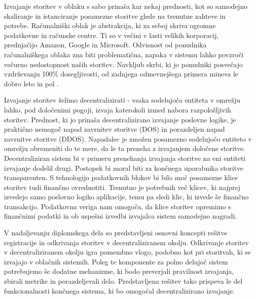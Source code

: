 \documentclass[a4paper, 12pt]{book}
\begin{document}
Izvajanje storitev v oblaku s sabo prinaša kar nekaj prednosti, kot so samodejno skaliranje in istanciranje posamezne storitve glede na trenutne zahteve in potrebe.
Računalniški oblak je abstrakcija, ki za seboj skriva ogromne podatkovne in računske centre.
Ti so v večini v lasti velikih korporacij, prednjačijo Amazon, Google in Microsoft.
Odvisnost od ponudnika računalniškega oblaka zna biti problematična, napaka v sistemu lahko povzroči večurno nedostopnost naših storitev. 
Navkljub skrbi, ki jo ponudniki posvečajo vzdrževanju 100\% dosegljivosti, od zadnjega odmevnejšega primera mineva le dobro leto in pol \cite{awsFail}.

Izvajanje storitev želimo decentralizirati - vsaka sodelujoča entiteta v omrežju lahko, pod določenimi pogoji, izvaja katerokoli izmed nabora razpoložljivih storitev.
Prednost, ki jo prinaša decentralizirano izvajanje poslovne logike, je praktično nemogoč napad zavrnitev storitve (DOS) in porazdeljen napad zavrnitve storitve (DDOS).
Napadalec je zmožen posamezno sodelujočo entiteto v omrežju obremeniti do te mere, da le ta preneha z izvajanjem določene storitve.
Decentraliziran sistem bi v primeru prenehanja izvajanja storitve na eni entiteti izvajanje dodelil drugi. Postopek bi moral biti za končnega uporabnika storitve transparenten.
S tehnologijo podatkovnih blokov bi bilo moč posamezne klice storitev tudi finančno ovrednotiti.
Trenutno je potrebnih več klicev, ki najprej izvedejo samo poslovno logiko aplikacije, temu pa sledi klic, ki izvede še finančno transakcijo.
Podatkovna veriga nam omogoča, da klice storitev opremimo s finančnimi podatki in ob uspešni izvedbi izvajalca sistem samodejno nagradi.

V nadaljevanju diplomskega dela so predstavljeni osnovni koncepti rešitve registracije in odkrivanja storitev v decentraliziranem okolju.
Odkrivanje storitev v decentraliziranem okolju igra pomembno vlogo, podobno kot pri storitvah, ki se izvajajo v oblačnih sistemih.
Poleg te komponente za polno delujoč sistem potrebujemo še dodatne mehanizme, ki bodo preverjali pravilnost izvajanja, zbirali metrike in porazdeljevali delo.
Predstavljena rešitev tako prispeva le del funkcionalnosti končnega sistema, ki bo omogočal decentralizirano izvajanje.
\end{document}
